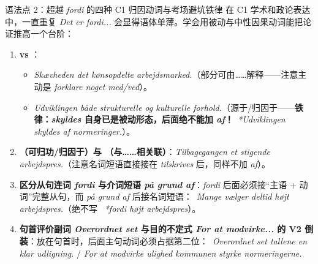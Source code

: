 \begin{grammatikbox}{语法点 2：超越 \textit{fordi} 的四种 C1 归因动词与考场避坑铁律}
在 C1 学术和政论表达中，一直重复 \textit{Det er fordi...} 会显得语体单薄。学会用被动与中性因果动词能把论证推高一个台阶：
\begin{enumerate}
  \item \textbf{ vs }：
    \begin{itemize}
      \item \textit{Skævheden  det kønsopdelte arbejdsmarked.}（部分可由……解释——注意主动是 \textit{forklare noget med/ved}）。
      \item \textit{Udviklingen  både strukturelle og kulturelle forhold.}（源于/归因于——\textbf{铁律：\textit{skyldes} 自身已是被动形态，后面绝不能加 \textit{af}！}\ \textit{*Udviklingen skyldes af normeringer.}）。
    \end{itemize}
  \item \textbf{（可归功/归因于）与 （与……相关联）}：\textit{Tilbagegangen  et stigende arbejdspres.}（注意名词短语直接接在 \textit{tilskrives} 后，同样不加 \textit{af}）。
  \item \textbf{区分从句连词 \textit{fordi} 与介词短语 \textit{på grund af}}：\textit{fordi} 后面必须接“主语 + 动词”完整从句，而 \textit{på grund af} 后接名词短语：\ \textit{Mange vælger deltid  højt arbejdspres.}（绝不写 \ \textit{*fordi højt arbejdspres}）。
  \item \textbf{句首评价副词 \textit{Overordnet set} 与目的不定式 \textit{For at modvirke...} 的 V2 倒装}：放在句首时，后面主句动词必须占据第二位：\ \textit{Overordnet set  tallene en klar udligning.} / \textit{For at modvirke ulighed  kommunen styrke normeringerne.}
\end{enumerate}
\end{grammatikbox}


